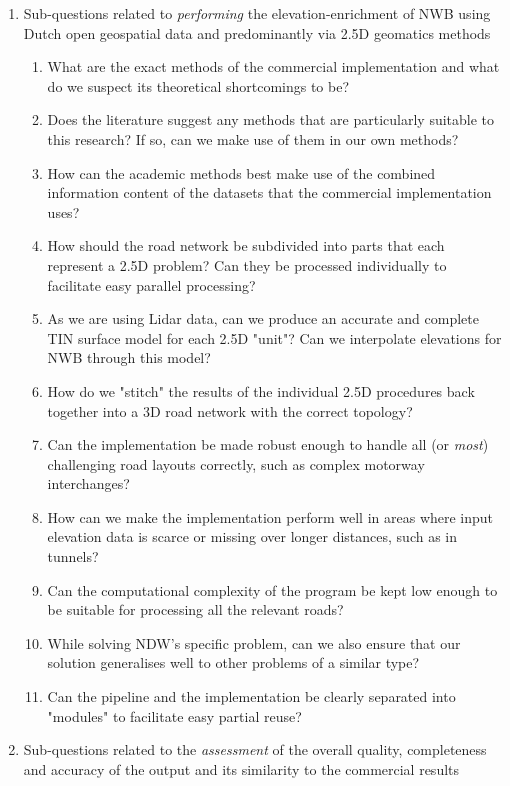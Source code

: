 \begin{enumerate}
    \item Sub-questions related to \textit{performing} the elevation-enrichment of NWB using Dutch open geospatial data and predominantly via 2.5D geomatics methods
    \begin{enumerate}
        \item What are the exact methods of the commercial implementation and what do we suspect its theoretical shortcomings to be?
        \item Does the literature suggest any methods that are particularly suitable to this research? If so, can we make use of them in our own methods?
        \item How can the academic methods best make use of the combined information content of the datasets that the commercial implementation uses?
        \item How should the road network be subdivided into parts that each represent a 2.5D problem? Can they be processed individually to facilitate easy parallel processing?
        \item As we are using Lidar data, can we produce an accurate and complete TIN surface model for each 2.5D "unit"? Can we interpolate elevations for NWB through this model?
        \item How do we "stitch" the results of the individual 2.5D procedures back together into a 3D road network with the correct topology?
        \item Can the implementation be made robust enough to handle all (or \textit{most}) challenging road layouts correctly, such as complex motorway interchanges?
        \item How can we make the implementation perform well in areas where input elevation data is scarce or missing over longer distances, such as in tunnels?
        \item Can the computational complexity of the program be kept low enough to be suitable for processing all the relevant roads?
        \item While solving NDW's specific problem, can we also ensure that our solution generalises well to other problems of a similar type?
        \item Can the pipeline and the implementation be clearly separated into "modules" to facilitate easy partial reuse?
    \end{enumerate}
    \item Sub-questions related to the \textit{assessment} of the overall quality, completeness and accuracy of the output and its similarity to the commercial results

\end{enumerate}
